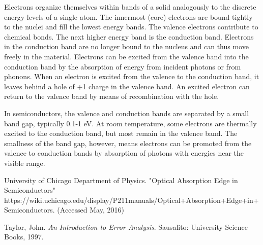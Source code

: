 \documentclass{article}
\begin{document}
Electrons organize themselves within bands of a solid analogously to the discrete energy levels of a single atom. The innermost (core) electrons are bound tightly to the nuclei and fill the lowest energy bands. The valence electrons contribute to chemical bonds. The next higher energy band is the conduction band. Electrons in the conduction band are no longer bound to the nucleus and can thus move freely in the material. Electrons can be excited from the valence band into the conduction band by the absorption of energy from incident photons or from phonons. When an electron is excited from the valence to the conduction band, it leaves behind a hole of +1 charge in the valence band. An excited electron can return to the valence band by means of recombination with the hole.

\hspace{.25cm}

In semiconductors, the valence and conduction bands are separated by a small band gap, typically 0.1-1 eV. At room temperature, some electrons are thermally excited to the conduction band, but most remain in the valence band. The smallness of the band gap, however, means electrons can be promoted from the valence to conduction bands by absorption of photons with energies near the visible range.

\begin{thebibliography}{10}

		University of Chicago Department of Physics. "Optical Absorption Edge in Semiconductors"\\
		https://wiki.uchicago.edu/display/P211manuals/Optical+Absorption+Edge+in+Semiconductors. (Accessed May, 2016)

		Taylor, John. \emph{An Introduction to Error Analysis}. Sausalito: University Science Books, 1997.
		
\end{thebibliography}
\end{document}
